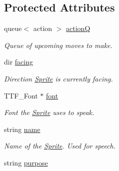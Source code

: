 \subsection*{Protected Attributes}
\begin{DoxyCompactItemize}
\item 
queue$<$ action $>$ \hyperlink{class_sprite_a8b183d19c55c1f0928075bd2cb926f68}{actionQ}\hypertarget{class_sprite_a8b183d19c55c1f0928075bd2cb926f68}{}\label{class_sprite_a8b183d19c55c1f0928075bd2cb926f68}

\begin{DoxyCompactList}\small\item\em Queue of upcoming moves to make. \end{DoxyCompactList}\item 
dir \hyperlink{class_sprite_a40357a4e61f454decf1970929e9d2d0c}{facing}\hypertarget{class_sprite_a40357a4e61f454decf1970929e9d2d0c}{}\label{class_sprite_a40357a4e61f454decf1970929e9d2d0c}

\begin{DoxyCompactList}\small\item\em Direction \hyperlink{class_sprite}{Sprite} is currently facing. \end{DoxyCompactList}\item 
T\+T\+F\+\_\+\+Font $\ast$ \hyperlink{class_sprite_aa9beec56e0e61eb611b204364fe446ce}{font}\hypertarget{class_sprite_aa9beec56e0e61eb611b204364fe446ce}{}\label{class_sprite_aa9beec56e0e61eb611b204364fe446ce}

\begin{DoxyCompactList}\small\item\em Font the \hyperlink{class_sprite}{Sprite} uses to \textquotesingle{}speak\textquotesingle{}. \end{DoxyCompactList}\item 
string \hyperlink{class_sprite_a166409bbd17355e157618ec02441dab8}{name}\hypertarget{class_sprite_a166409bbd17355e157618ec02441dab8}{}\label{class_sprite_a166409bbd17355e157618ec02441dab8}

\begin{DoxyCompactList}\small\item\em Name of the \hyperlink{class_sprite}{Sprite}. Used for speech. \end{DoxyCompactList}\item 
string \hyperlink{class_sprite_ad23c15d2b97d15db7522f9caa1a0b7a2}{purpose}\hypertarget{class_sprite_ad23c15d2b97d15db7522f9caa1a0b7a2}{}\label{class_sprite_ad23c15d2b97d15db7522f9caa1a0b7a2}


\end{DoxyCompactItemize}
